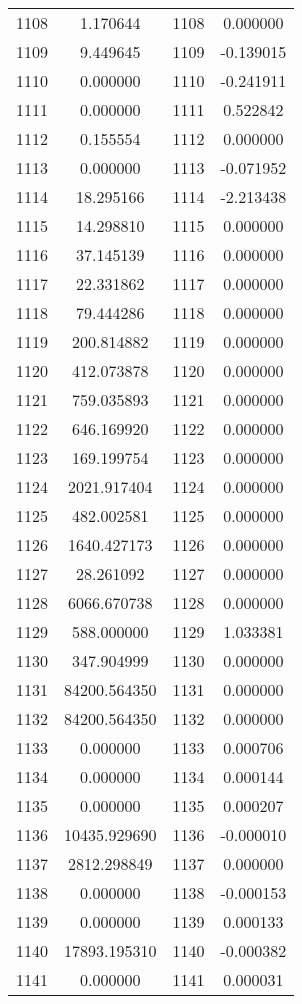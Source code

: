 \documentclass[12pt]{article}
\begin{document}
\begin{longtable}{@{}cccc@{}}
1108 & 1.170644 & 1108 & 0.000000 \\
1109 & 9.449645 & 1109 & -0.139015 \\
1110 & 0.000000 & 1110 & -0.241911 \\
1111 & 0.000000 & 1111 & 0.522842 \\
1112 & 0.155554 & 1112 & 0.000000 \\
1113 & 0.000000 & 1113 & -0.071952 \\
1114 & 18.295166 & 1114 & -2.213438 \\
1115 & 14.298810 & 1115 & 0.000000 \\
1116 & 37.145139 & 1116 & 0.000000 \\
1117 & 22.331862 & 1117 & 0.000000 \\
1118 & 79.444286 & 1118 & 0.000000 \\
1119 & 200.814882 & 1119 & 0.000000 \\
1120 & 412.073878 & 1120 & 0.000000 \\
1121 & 759.035893 & 1121 & 0.000000 \\
1122 & 646.169920 & 1122 & 0.000000 \\
1123 & 169.199754 & 1123 & 0.000000 \\
1124 & 2021.917404 & 1124 & 0.000000 \\
1125 & 482.002581 & 1125 & 0.000000 \\
1126 & 1640.427173 & 1126 & 0.000000 \\
1127 & 28.261092 & 1127 & 0.000000 \\
1128 & 6066.670738 & 1128 & 0.000000 \\
1129 & 588.000000 & 1129 & 1.033381 \\
1130 & 347.904999 & 1130 & 0.000000 \\
1131 & 84200.564350 & 1131 & 0.000000 \\
1132 & 84200.564350 & 1132 & 0.000000 \\
1133 & 0.000000 & 1133 & 0.000706 \\
1134 & 0.000000 & 1134 & 0.000144 \\
1135 & 0.000000 & 1135 & 0.000207 \\
1136 & 10435.929690 & 1136 & -0.000010 \\
1137 & 2812.298849 & 1137 & 0.000000 \\
1138 & 0.000000 & 1138 & -0.000153 \\
1139 & 0.000000 & 1139 & 0.000133 \\
1140 & 17893.195310 & 1140 & -0.000382 \\
1141 & 0.000000 & 1141 & 0.000031 \\

\end{longtable}
\end{document}

